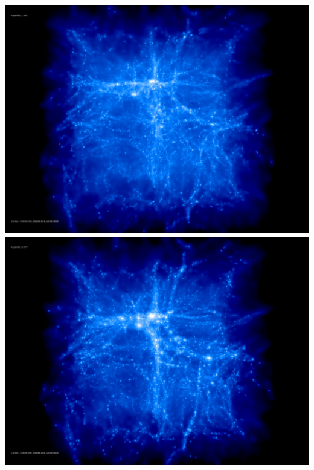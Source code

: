 \includegraphics[scale=0.1]{r256/h100/stages_18/50.jpg} 
\includegraphics[scale=0.1]{r256/h100/stages_18/100.jpg}  \\

